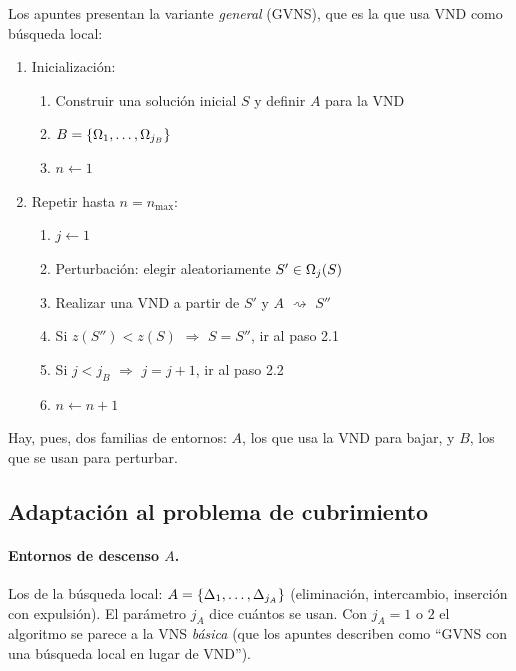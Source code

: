 Los apuntes presentan la variante \emph{general} (GVNS), que es la que usa VND como búsqueda
local:

\begin{apuntes}
\begin{enumerate}[label=\arabic*.,itemsep=0pt]
  \item Inicialización:
  \begin{enumerate}[label=1.\arabic*,itemsep=0pt]
    \item Construir una solución inicial $S$ y definir $A$ para la VND
    \item $B=\{\Omega_{1},\dots,\Omega_{j_B}\}$
    \item $n\gets 1$
  \end{enumerate}
  \item Repetir hasta $n=n_{\max}$:
  \begin{enumerate}[label=2.\arabic*,itemsep=0pt]
    \item $j\gets 1$
    \item Perturbación: elegir aleatoriamente $S'\in\Omega_{j}(S)$
    \item Realizar una VND a partir de $S'$ y $A$ $\rightsquigarrow$ $S''$
    \item Si $z(S'')<z(S)$ $\Rightarrow$ $S=S''$, ir al paso 2.1
    \item Si $j<j_B$ $\Rightarrow$ $j=j+1$, ir al paso 2.2
    \item $n\gets n+1$
  \end{enumerate}
\end{enumerate}
\end{apuntes}

Hay, pues, dos familias de entornos: $A$, los que usa la VND para bajar, y $B$, los que se
usan para perturbar.

\subsection{Adaptación al problema de cubrimiento}

\paragraph{Entornos de descenso $A$.} Los de la búsqueda local:
$A=\{\Delta_{1},\dots,\Delta_{j_A}\}$ (eliminación, intercambio, inserción con expulsión). El parámetro
$j_A$ dice cuántos se usan. Con $j_A=1$ o $2$ el algoritmo se parece a la VNS \emph{básica}
(que los apuntes describen como ``GVNS con una búsqueda local en lugar de VND'').

